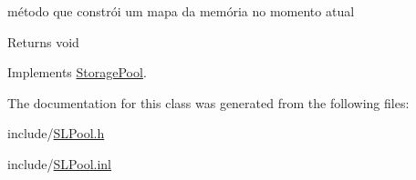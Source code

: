 método que constrói um mapa da memória no momento atual 

\begin{DoxyReturn}{Returns}
void 
\end{DoxyReturn}


Implements \hyperlink{class_storage_pool_aa30940ace73f59c81571feb4234abc1a}{Storage\+Pool}.



The documentation for this class was generated from the following files\+:\begin{DoxyCompactItemize}
\item 
include/\hyperlink{_s_l_pool_8h}{S\+L\+Pool.\+h}\item 
include/\hyperlink{_s_l_pool_8inl}{S\+L\+Pool.\+inl}\end{DoxyCompactItemize}
